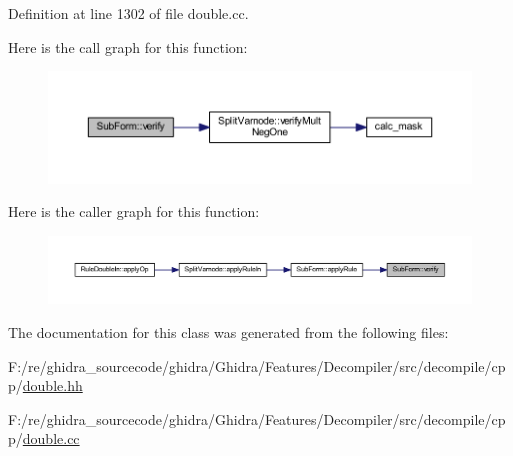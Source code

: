 Definition at line 1302 of file double.\+cc.

Here is the call graph for this function\+:
\nopagebreak
\begin{figure}[H]
\begin{center}
\leavevmode
\includegraphics[width=350pt]{class_sub_form_a9c6777b111bd5112862b798818ad2250_cgraph}
\end{center}
\end{figure}
Here is the caller graph for this function\+:
\nopagebreak
\begin{figure}[H]
\begin{center}
\leavevmode
\includegraphics[width=350pt]{class_sub_form_a9c6777b111bd5112862b798818ad2250_icgraph}
\end{center}
\end{figure}


The documentation for this class was generated from the following files\+:\begin{DoxyCompactItemize}
\item 
F\+:/re/ghidra\+\_\+sourcecode/ghidra/\+Ghidra/\+Features/\+Decompiler/src/decompile/cpp/\mbox{\hyperlink{double_8hh}{double.\+hh}}\item 
F\+:/re/ghidra\+\_\+sourcecode/ghidra/\+Ghidra/\+Features/\+Decompiler/src/decompile/cpp/\mbox{\hyperlink{double_8cc}{double.\+cc}}\end{DoxyCompactItemize}
